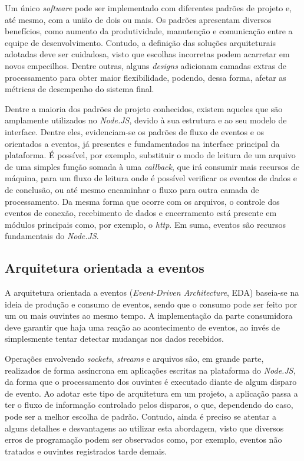 \documentclass[12pt]{article}
\begin{document}
Um único \textit{software} pode ser implementado com diferentes padrões de projeto e, até mesmo, com a união
de dois ou mais. Os padrões apresentam diversos benefícios, como aumento da produtividade, manutenção e comunicação
entre a equipe de desenvolvimento. Contudo, a definição das soluções arquiteturais adotadas deve ser 
cuidadosa, visto que escolhas incorretas podem acarretar em novos empecilhos. Dentre outras, 
alguns \textit{designs} adicionam camadas extras de processamento para obter maior flexibilidade, podendo, dessa forma, 
afetar as métricas de desempenho do sistema final. \cite[p. 13 - p. 14]{DIOGORESENDE}

Dentre a maioria dos padrões de projeto conhecidos, existem aqueles que são amplamente utilizados no 
\textit{Node.JS}, devido à sua estrutura e ao seu modelo de interface. Dentre eles, evidenciam-se
os padrões de fluxo de eventos e os orientados a eventos, já presentes e fundamentados na interface principal 
da plataforma. É possível, por exemplo, substituir o modo de leitura de um arquivo de 
uma simples função somada à uma \textit{callback}, que irá consumir mais recursos de máquina, para um fluxo de 
leitura onde é possível verificar os eventos de dados e de conclusão, ou até mesmo encaminhar o fluxo para 
outra camada de processamento. Da mesma forma que ocorre com os arquivos, o controle dos eventos 
de conexão, recebimento de dados e encerramento está presente em módulos principais como, por exemplo, 
o \textit{http}. Em suma, eventos são recursos fundamentais do \textit{Node.JS}. \cite[p. 15]{DIOGORESENDE}


\subsection{Arquitetura orientada a eventos}

A arquitetura orientada a eventos (\textit{Event-Driven Architecture}, EDA) baseia-se na ideia de produção e consumo 
de eventos, sendo que o consumo pode ser feito por um ou mais ouvintes ao mesmo tempo. A implementação da parte consumidora 
deve garantir que haja uma reação ao acontecimento de eventos, ao invés de simplesmente tentar detectar 
mudanças nos dados recebidos. \cite[p. 27]{DIOGORESENDE} 

Operações envolvendo \textit{sockets}, \textit{streams} e arquivos são, em grande parte, 
realizados de forma assíncrona em aplicações escritas na plataforma do \textit{Node.JS}, da forma que o processamento
dos ouvintes é executado diante de algum disparo de evento. \cite{MFO} Ao adotar este tipo de arquitetura em um projeto, 
a aplicação passa a ter o fluxo de informação controlado pelos disparos, o que, dependendo do caso, pode ser a melhor 
escolha de padrão. Contudo, ainda é preciso se atentar a alguns detalhes e desvantagens ao utilizar esta abordagem,
visto que diversos erros de programação podem ser observados como, por exemplo, eventos não tratados e ouvintes
registrados tarde demais. \cite[p. 28]{DIOGORESENDE}
\end{document}
